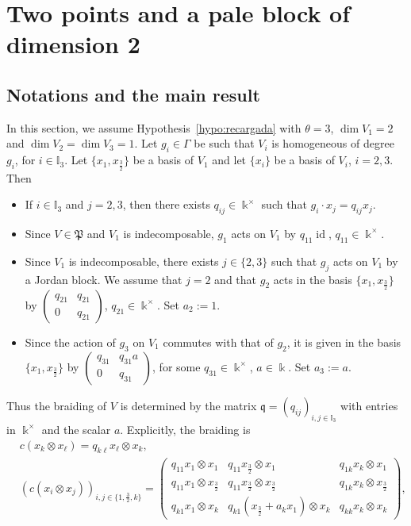 \documentclass[10pt,a4paper]{amsart}
\numberwithin{equation}{section}
\newcommand{\id}{\operatorname{id}}
\newcommand{\pale}{\mathfrak{P}}
\newcommand{\I}{{\mathbb I}}
\newcommand{\bq}{\mathfrak{q}}
\newcommand{\tresdos}{\frac{3}{2}}
\begin{document}
\section{Two points and a pale block of dimension 2}\label{sec:paleblock+2pts}
\subsection{Notations and the main result}%
In this section, we assume Hypothesis~\ref{hypo:recargada} with $\theta = 3$,
$\dim V_1= 2$ and $\dim V_2 = \dim V_3 = 1$.
Let $g_i\in \Gamma$ be such that $V_i$ is homogeneous of degree $g_i$, for $i\in \I_3$.
Let $\big\{x_1, x_{\tresdos}\big\}$ be a basis of $V_1$ and let $\{x_i\}$ be a basis of $V_i$, $i = 2,3$.
Then
\begin{itemize}\itemsep=0pt
\item If $i\in \I_3$ and $j= 2,3$, then there exists $q_{ij} \in \Bbbk^{\times}$ such that $g_i \cdot x_j = q_{ij} x_j$.
\item Since $V \in \pale$ and $V_1$ is indecomposable, $g_1$ acts on $V_1$ by $q_{11} \id$, $q_{11} \in \Bbbk^{\times}$.
\item Since $V_1$ is indecomposable, there exists $j \in \{2,3\}$ such that $g_j$ acts on $V_1$ by a Jordan block. We assume that $j = 2$
and that $g_2$ acts in the basis $\big\{x_1, x_{\tresdos}\big\}$ by
$\left(\begin{smallmatrix} q_{21} & q_{21} \\ 0 & q_{21}\end{smallmatrix}\right)$, $q_{21} \in \Bbbk^{\times}$.
Set $a_2 := 1$.
\item Since the action of $g_3$ on $V_1$ commutes with that of $g_2$,
it is given in the basis $\big\{x_1, x_{\tresdos}\big\}$ by
$\left(\begin{smallmatrix} q_{31} & q_{31}a \\ 0 & q_{31}\end{smallmatrix}\right)$, for some $q_{31} \in \Bbbk^{\times}$, $a \in \Bbbk$.
Set $a_3 := a$.
\end{itemize}
Thus the braiding of $V$ is determined by the matrix $\bq = (q_{ij})_{i,j \in \I_{3}}$ with entries in $\Bbbk^{\times}$
and the scalar $a$.
Explicitly, the braiding is
\begin{align*}%
&c(x_k\otimes x_\ell) = q_{k\ell} x_{\ell} \otimes x_k,
\\
&(c(x_i \otimes x_j))_{i,j\in \{1,\tresdos, k \}} =
\begin{pmatrix}
q_{11} x_1 \otimes x_1& q_{11} x_{\tresdos} \otimes x_1& q_{1k} x_k \otimes x_1
\\
q_{11} x_1 \otimes x_{\tresdos} & q_{11} x_{\tresdos} \otimes x_{\tresdos} & q_{1k} x_k \otimes x_{\tresdos}
\\
q_{k1} x_1 \otimes x_k & q_{k1}(x_{\tresdos} + a_kx_1) \otimes x_k & q_{kk} x_k \otimes x_k
\end{pmatrix}\!,
\end{align*}
\end{document}
